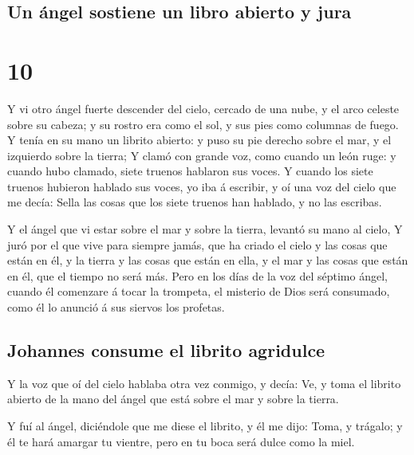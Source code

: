 \hypertarget{un-uxe1ngel-sostiene-un-libro-abierto-y-jura}{%
\subsection{Un ángel sostiene un libro abierto y
jura}\label{un-uxe1ngel-sostiene-un-libro-abierto-y-jura}}

\hypertarget{section-9}{%
\section{10}\label{section-9}}

 Y vi otro ángel fuerte descender del cielo, cercado de
una nube, y el arco celeste sobre su cabeza; y su rostro era como el
sol, y sus pies como columnas de fuego.  Y tenía en su
mano un librito abierto: y puso su pie derecho sobre el mar, y el
izquierdo sobre la tierra;  Y clamó con grande voz, como
cuando un león ruge: y cuando hubo clamado, siete truenos hablaron sus
voces.  Y cuando los siete truenos hubieron hablado sus
voces, yo iba á escribir, y oí una voz del cielo que me decía: Sella las
cosas que los siete truenos han hablado, y no las escribas.

 Y el ángel que vi estar sobre el mar y sobre la tierra,
levantó su mano al cielo,  Y juró por el que vive para
siempre jamás, que ha criado el cielo y las cosas que están en él, y la
tierra y las cosas que están en ella, y el mar y las cosas que están en
él, que el tiempo no será más.  Pero en los días de la voz
del séptimo ángel, cuando él comenzare á tocar la trompeta, el misterio
de Dios será consumado, como él lo anunció á sus siervos los profetas.

\hypertarget{johannes-consume-el-librito-agridulce}{%
\subsection{Johannes consume el librito
agridulce}\label{johannes-consume-el-librito-agridulce}}

 Y la voz que oí del cielo hablaba otra vez conmigo, y
decía: Ve, y toma el librito abierto de la mano del ángel que está sobre
el mar y sobre la tierra.

 Y fuí al ángel, diciéndole que me diese el librito, y él
me dijo: Toma, y trágalo; y él te hará amargar tu vientre, pero en tu
boca será dulce como la miel.

